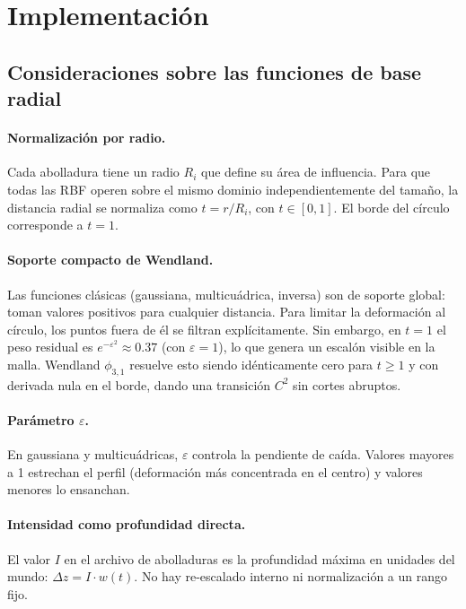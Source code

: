 \documentclass[12pt, letterpaper]{article}
\begin{document}
\section{Implementación}

\subsection{Consideraciones sobre las funciones de base radial}

\paragraph{Normalización por radio.}
Cada abolladura tiene un radio \(R_i\) que define su área de influencia.
Para que todas las RBF operen sobre el mismo dominio independientemente del
tamaño, la distancia radial se normaliza como \(t = r / R_i\), con \(t \in [0, 1]\).
El borde del círculo corresponde a \(t = 1\).

\paragraph{Soporte compacto de Wendland.}
Las funciones clásicas (gaussiana, multicuádrica, inversa) son de soporte
global: toman valores positivos para cualquier distancia. Para limitar la
deformación al círculo, los puntos fuera de él se filtran explícitamente.
Sin embargo, en \(t = 1\) el peso residual es \(e^{-\varepsilon^2} \approx 0.37\)
(con \(\varepsilon = 1\)), lo que genera un escalón visible en la malla.
Wendland \(\phi_{3,1}\) resuelve esto siendo idénticamente cero para \(t \ge 1\)
y con derivada nula en el borde, dando una transición \(C^2\) sin cortes abruptos.

\paragraph{Parámetro \(\varepsilon\).}
En gaussiana y multicuádricas, \(\varepsilon\) controla la pendiente de caída.
Valores mayores a 1 estrechan el perfil (deformación más concentrada en el centro)
y valores menores lo ensanchan.

\paragraph{Intensidad como profundidad directa.}
El valor \(I\) en el archivo de abolladuras es la profundidad máxima en
unidades del mundo: \(\Delta z = I \cdot w(t)\). No hay re-escalado interno
ni normalización a un rango fijo.
\end{document}
